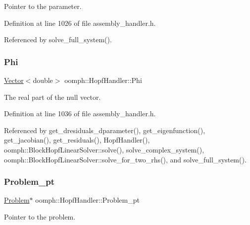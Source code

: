 Pointer to the parameter. 



Definition at line 1026 of file assembly\+\_\+handler.\+h.



Referenced by solve\+\_\+full\+\_\+system().

\mbox{\label{classoomph_1_1HopfHandler_a117a5e192857e2f51c9c5d392fd6e5e7}} 
\subsubsection{\texorpdfstring{Phi}{Phi}}
{\footnotesize\ttfamily \hyperlink{classoomph_1_1Vector}{Vector}$<$double$>$ oomph\+::\+Hopf\+Handler\+::\+Phi\hspace{0.3cm}{\ttfamily [private]}}



The real part of the null vector. 



Definition at line 1036 of file assembly\+\_\+handler.\+h.



Referenced by get\+\_\+dresiduals\+\_\+dparameter(), get\+\_\+eigenfunction(), get\+\_\+jacobian(), get\+\_\+residuals(), Hopf\+Handler(), oomph\+::\+Block\+Hopf\+Linear\+Solver\+::solve(), solve\+\_\+complex\+\_\+system(), oomph\+::\+Block\+Hopf\+Linear\+Solver\+::solve\+\_\+for\+\_\+two\+\_\+rhs(), and solve\+\_\+full\+\_\+system().

\mbox{\label{classoomph_1_1HopfHandler_aa4464f9abb45bad3222f748703c31155}} 
\subsubsection{\texorpdfstring{Problem\+\_\+pt}{Problem\_pt}}
{\footnotesize\ttfamily \hyperlink{classoomph_1_1Problem}{Problem}$\ast$ oomph\+::\+Hopf\+Handler\+::\+Problem\+\_\+pt\hspace{0.3cm}{\ttfamily [private]}}



Pointer to the problem. 




